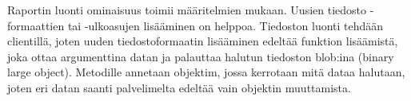 Raportin luonti ominaisuus toimii määritelmien mukaan.
%
Uusien tiedosto -formaattien tai -ulkoasujen lisääminen on helppoa. 
Tiedoston luonti tehdään clientillä, joten uuden tiedostoformaatin lisääminen edeltää funktion lisäämistä, 
joka ottaa argumenttina datan ja palauttaa halutun tiedoston blob:ina (binary large object).
%
Metodille annetaan objektim, jossa kerrotaan mitä dataa halutaan, joten eri datan saanti palvelimelta edeltää vain objektin muuttamista.





